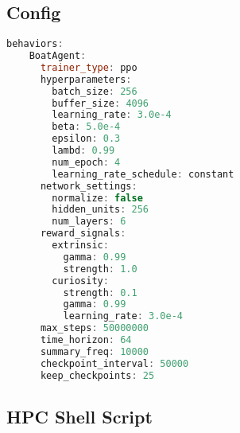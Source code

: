   \subsection{Config}\label{config}
  \begin{adjustbox}{width=\textwidth/2}
  \begin{lstlisting}[language=C++]
      behaviors:
    BoatAgent:
      trainer_type: ppo
      hyperparameters:
        batch_size: 256
        buffer_size: 4096
        learning_rate: 3.0e-4
        beta: 5.0e-4
        epsilon: 0.3
        lambd: 0.99
        num_epoch: 4
        learning_rate_schedule: constant
      network_settings:
        normalize: false
        hidden_units: 256
        num_layers: 6
      reward_signals:
        extrinsic:
          gamma: 0.99
          strength: 1.0
        curiosity:
          strength: 0.1
          gamma: 0.99
          learning_rate: 3.0e-4
      max_steps: 50000000
      time_horizon: 64
      summary_freq: 10000
      checkpoint_interval: 50000
      keep_checkpoints: 25
  \end{lstlisting}
  \end{adjustbox}

  \subsection*{HPC Shell Script}\label{sec:shell_script}
  
  





\